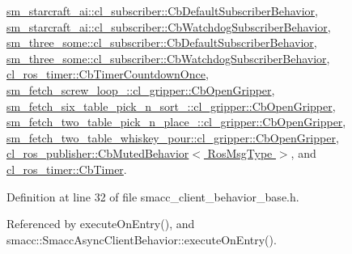 \hyperlink{classsm__starcraft__ai_1_1cl__subscriber_1_1CbDefaultSubscriberBehavior_af8cd24389471af7133f258839f899932}{sm\+\_\+starcraft\+\_\+ai\+::cl\+\_\+subscriber\+::\+Cb\+Default\+Subscriber\+Behavior}, \hyperlink{classsm__starcraft__ai_1_1cl__subscriber_1_1CbWatchdogSubscriberBehavior_a74aa8ecc420589bda47b90877bc120a7}{sm\+\_\+starcraft\+\_\+ai\+::cl\+\_\+subscriber\+::\+Cb\+Watchdog\+Subscriber\+Behavior}, \hyperlink{classsm__three__some_1_1cl__subscriber_1_1CbDefaultSubscriberBehavior_a9d1f8dfb490a26b1fcdab1b740436837}{sm\+\_\+three\+\_\+some\+::cl\+\_\+subscriber\+::\+Cb\+Default\+Subscriber\+Behavior}, \hyperlink{classsm__three__some_1_1cl__subscriber_1_1CbWatchdogSubscriberBehavior_a6bd938abf54a95555182345a5e53cafe}{sm\+\_\+three\+\_\+some\+::cl\+\_\+subscriber\+::\+Cb\+Watchdog\+Subscriber\+Behavior}, \hyperlink{classcl__ros__timer_1_1CbTimerCountdownOnce_a613662c4a4106ece0ce1dee198d1aba2}{cl\+\_\+ros\+\_\+timer\+::\+Cb\+Timer\+Countdown\+Once}, \hyperlink{classsm__fetch__screw__loop__1_1_1cl__gripper_1_1CbOpenGripper_a2d50cf912c699839eda7c15a490e0b9f}{sm\+\_\+fetch\+\_\+screw\+\_\+loop\+\_\+::cl\+\_\+gripper\+::\+Cb\+Open\+Gripper}, \hyperlink{classsm__fetch__six__table__pick__n__sort__1_1_1cl__gripper_1_1CbOpenGripper_a78ac2d4b93c877f2f5786394b1e3afb6}{sm\+\_\+fetch\+\_\+six\+\_\+table\+\_\+pick\+\_\+n\+\_\+sort\+\_\+::cl\+\_\+gripper\+::\+Cb\+Open\+Gripper}, \hyperlink{classsm__fetch__two__table__pick__n__place__1_1_1cl__gripper_1_1CbOpenGripper_a08f95a8f05e33c1a04b77fa5f3465d78}{sm\+\_\+fetch\+\_\+two\+\_\+table\+\_\+pick\+\_\+n\+\_\+place\+\_\+::cl\+\_\+gripper\+::\+Cb\+Open\+Gripper}, \hyperlink{classsm__fetch__two__table__whiskey__pour_1_1cl__gripper_1_1CbOpenGripper_a8b2a4e3cd933033fcf83a73f4a7eb4f4}{sm\+\_\+fetch\+\_\+two\+\_\+table\+\_\+whiskey\+\_\+pour\+::cl\+\_\+gripper\+::\+Cb\+Open\+Gripper}, \hyperlink{classcl__ros__publisher_1_1CbMutedBehavior_a79376d9160e3bd44678a2c0d89f1b4de}{cl\+\_\+ros\+\_\+publisher\+::\+Cb\+Muted\+Behavior$<$ Ros\+Msg\+Type $>$}, and \hyperlink{classcl__ros__timer_1_1CbTimer_aceba45e86271cf1b7333e2f42c246a38}{cl\+\_\+ros\+\_\+timer\+::\+Cb\+Timer}.



Definition at line 32 of file smacc\+\_\+client\+\_\+behavior\+\_\+base.\+h.



Referenced by execute\+On\+Entry(), and smacc\+::\+Smacc\+Async\+Client\+Behavior\+::execute\+On\+Entry().


